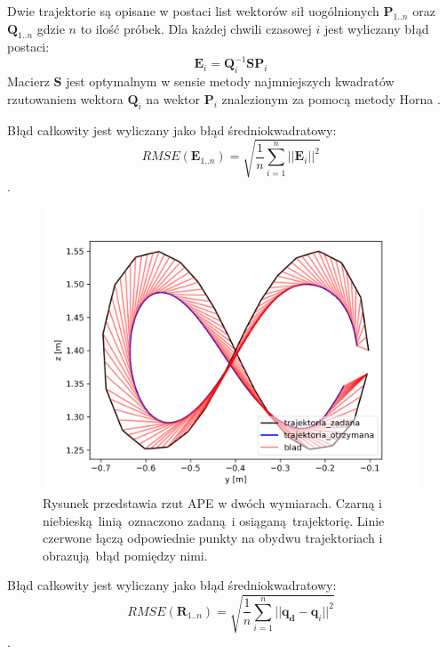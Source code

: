 Dwie trajektorie są opisane w postaci list wektorów sił uogólnionych $\boldsymbol{P}_{1..n}$ oraz $\boldsymbol{Q}_{1..n}$ gdzie $n$ to ilość próbek. Dla każdej chwili czasowej $i$ jest wyliczany błąd postaci:
\begin{equation}
\boldsymbol{E}_i = \boldsymbol{Q}_i^{-1}\boldsymbol{S}\boldsymbol{P}_i
\end{equation}
Macierz $\boldsymbol{S}$ jest optymalnym w sensie metody najmniejszych kwadratów rzutowaniem wektora $\boldsymbol{Q}_i$ na wektor $\boldsymbol{P}_i$ znalezionym za pomocą metody Horna \cite{bib:horn}. 

Błąd całkowity jest wyliczany jako błąd średniokwadratowy:
\begin{equation}
RMSE(\boldsymbol{E}_{1..n}) = \sqrt{\frac{1}{n}\sum_{i=1}^{n}||\boldsymbol{E}_i||^2}
\end{equation}.



\begin{figure}
	\centering
		\includegraphics[width=.45\textwidth]{../../velma/przerobione_testy/out/osemka/yz_ate_plot_podnoszenie_miekki_bez_brak.png}
		\caption{Rysunek przedstawia rzut APE w dwóch wymiarach. Czarną i niebieską linią oznaczono zadaną i osiąganą trajektorię. Linie czerwone łączą odpowiednie punkty na obydwu trajektoriach i obrazują błąd pomiędzy nimi.}
		\label{fig:przykl_ape}
\end{figure}




Błąd całkowity jest wyliczany jako błąd średniokwadratowy:
\begin{equation}
RMSE(\boldsymbol{R}_{1..n}) = \sqrt{\frac{1}{n}\sum_{i=1}^{n}||\boldsymbol{q_d}-\boldsymbol{q}_i||^2}
\end{equation}.

